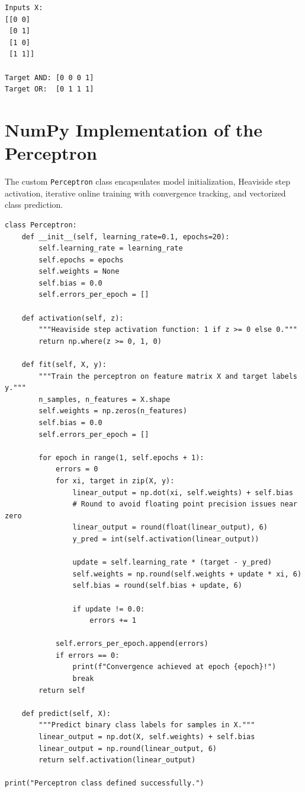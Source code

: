 \documentclass[12pt]{article}
\begin{document}
\begin{lstlisting}[style=output]
Inputs X:
[[0 0]
 [0 1]
 [1 0]
 [1 1]]

Target AND: [0 0 0 1]
Target OR:  [0 1 1 1]
\end{lstlisting}

\newpage
\section{NumPy Implementation of the Perceptron}

The custom \texttt{Perceptron} class encapsulates model initialization, Heaviside step activation, iterative online training with convergence tracking, and vectorized class prediction.

\begin{lstlisting}[style=code]
class Perceptron:
    def __init__(self, learning_rate=0.1, epochs=20):
        self.learning_rate = learning_rate
        self.epochs = epochs
        self.weights = None
        self.bias = 0.0
        self.errors_per_epoch = []

    def activation(self, z):
        """Heaviside step activation function: 1 if z >= 0 else 0."""
        return np.where(z >= 0, 1, 0)

    def fit(self, X, y):
        """Train the perceptron on feature matrix X and target labels y."""
        n_samples, n_features = X.shape
        self.weights = np.zeros(n_features)
        self.bias = 0.0
        self.errors_per_epoch = []

        for epoch in range(1, self.epochs + 1):
            errors = 0
            for xi, target in zip(X, y):
                linear_output = np.dot(xi, self.weights) + self.bias
                # Round to avoid floating point precision issues near zero
                linear_output = round(float(linear_output), 6)
                y_pred = int(self.activation(linear_output))
                
                update = self.learning_rate * (target - y_pred)
                self.weights = np.round(self.weights + update * xi, 6)
                self.bias = round(self.bias + update, 6)
                
                if update != 0.0:
                    errors += 1
                    
            self.errors_per_epoch.append(errors)
            if errors == 0:
                print(f"Convergence achieved at epoch {epoch}!")
                break
        return self

    def predict(self, X):
        """Predict binary class labels for samples in X."""
        linear_output = np.dot(X, self.weights) + self.bias
        linear_output = np.round(linear_output, 6)
        return self.activation(linear_output)

print("Perceptron class defined successfully.")
\end{lstlisting}
\end{document}

